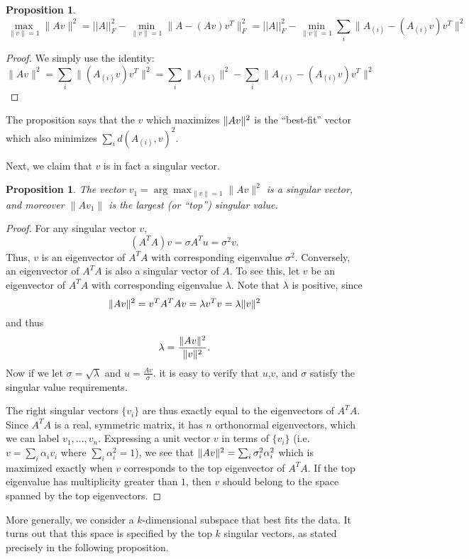 \documentclass{book}
\newtheorem{proposition}[theorem]{Proposition}
\numberwithin{exercise}{chapter}
\begin{document}
\begin{proposition}
$$\max_{\|v\| = 1}\|Av\|^2 = ||A||_F^2-\min_{\|v\| = 1}\|A -
(Av)v^T\|_F^2 = ||A||_F^2- \min_{\|v\| = 1} \sum_{i}\|A_{(i)} -
(A_{(i)}v)v^T\|^2 $$
\end{proposition}

\begin{proof}
We simply use the identity:
$$\|Av\|^2 = \sum_i \|(A_{(i)}v)v^T\|^2 = \sum_i \|A_{(i)}\|^2 - \sum_{i}\|A_{(i)} - (A_{(i)}v)v^T\|^2 $$
\end{proof}

The proposition says that the $v$ which maximizes $\|Av\|^2$ is the
``best-fit'' vector which also minimizes $\sum_i d(A_{(i)},v)^2$.

Next, we claim that $v$ is in fact a singular vector.

\begin{proposition}\label{topsingularvector}
The vector $v_1 = \arg\max_{\|v\| = 1}\|Av\|^2$ is a
singular vector, and moreover $\|Av_1\|$ is the largest (or ``top'') singular value.
\end{proposition}

\begin{proof}
For any singular vector $v$,
\[
(A^TA)v = \sigma A^T u = \sigma^2 v.
\]
Thus, $v$ is an eigenvector of $A^TA$ with
corresponding eigenvalue $\sigma^2$.  Conversely, an eigenvector of
$A^TA$ is also a singular vector of $A$.  To see this, let $v$ be an
eigenvector of $A^TA$ with corresponding eigenvalue $\lambda$.
Note that $\lambda$ is positive, since
\[
\|Av\|^2 = v^TA^TAv = \lambda v^Tv
= \lambda\|v\|^2
\]
and thus
\[
\lambda = \frac{\|Av\|^2}{\|v\|^2}.
\]
Now if we let $\sigma = \sqrt{\lambda}$ and $u = \frac{Av}{\sigma}$. it
is easy to verify that $u$,$v$, and $\sigma$ satisfy the singular
value requirements.

The right singular vectors $\{v_i\}$ are thus exactly equal to the
eigenvectors of $A^TA$.  Since $A^TA$ is a real, symmetric matrix, it
has $n$ orthonormal  eigenvectors, which we can label $v_1,...,v_n$.
Expressing a unit vector $v$ in terms of $\{v_i\}$ (i.e. $v = \sum_i
\alpha_i v_i$ where $\sum_i \alpha_i^2 = 1$), we see that $\|Av\|^2
= \sum_i \sigma_i^2 \alpha_i^2$ which is maximized exactly when $v$ corresponds
to the top eigenvector of $A^TA$. If the top eigenvalue has multiplicity greater than $1$,
then $v$ should belong to the space spanned by the top eigenvectors.
\end{proof}

More generally, we consider a $k$-dimensional subspace that best fits the
data. It turns out that this space is specified by the top $k$ singular
vectors, as stated precisely in the following proposition.
\end{document}
